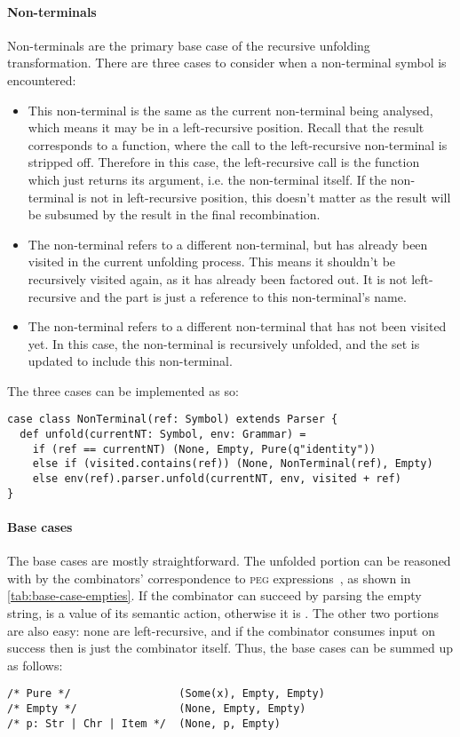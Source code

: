 \documentclass[../../main.tex]{subfiles}
\begin{document}
\paragraph{Non-terminals}
Non-terminals are the primary base case of the recursive unfolding transformation.
There are three cases to consider when a non-terminal symbol is encountered:
\begin{itemize}
  \item This non-terminal is the same as the current non-terminal being analysed, which means it may be in a left-recursive position. Recall that the  result corresponds to a function, where the call to the left-recursive non-terminal is stripped off. Therefore in this case, the left-recursive call is the  function which just returns its argument, i.e. the non-terminal itself. If the non-terminal is not in left-recursive position, this doesn't matter as the  result will be subsumed by the  result in the final recombination.
  \item The non-terminal refers to a different non-terminal, but has already been visited in the current unfolding process. This means it shouldn't be recursively visited again, as it has already been factored out. It is not left-recursive and the  part is just a reference to this non-terminal's name.
  \item The non-terminal refers to a different non-terminal that has not been visited yet. In this case, the non-terminal is recursively unfolded, and the  set is updated to include this non-terminal.
\end{itemize}
%
The three cases can be implemented as so:
\begin{verbatim}
case class NonTerminal(ref: Symbol) extends Parser {
  def unfold(currentNT: Symbol, env: Grammar) =
    if (ref == currentNT) (None, Empty, Pure(q"identity"))
    else if (visited.contains(ref)) (None, NonTerminal(ref), Empty)
    else env(ref).parser.unfold(currentNT, env, visited + ref)
}
\end{verbatim}

\paragraph{Base cases}
The base cases are mostly straightforward.
The unfolded  portion can be reasoned with by the combinators' correspondence to \textsc{peg} expressions~\cite{eichenroth_fast_2022}, as shown in \cref{tab:base-case-empties}. If the combinator can succeed by parsing the empty string,  is a  value of its semantic action, otherwise it is .
The other two portions are also easy: none are left-recursive, and if the combinator consumes input on success then  is just the combinator itself.
Thus, the base cases can be summed up as follows:
\begin{verbatim}
/* Pure */                 (Some(x), Empty, Empty)
/* Empty */                (None, Empty, Empty)
/* p: Str | Chr | Item */  (None, p, Empty)
\end{verbatim}
\end{document}
